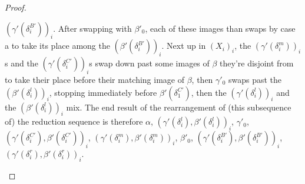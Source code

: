 \documentclass{article}
\theoremstyle{definition}
\theoremstyle{lemma}
\theoremstyle{remark}
\begin{document}
\begin{proof}
\begin{itemize}
$(\gamma'(\delta^{B'}_i))_i$. After swapping with $\beta'_0$, each of these images than swaps by case a to take its place among the $(\beta'(\delta^{B'}_i))_i$. Next up in $(X_i)_i$, the $(\gamma'(\delta^m_i))_i$s and the $(\gamma'(\delta^{C'}_i))_i$s swap down past some images of $\beta$ they're disjoint from to take their place before their matching image of $\beta$, then $\gamma'_0$ swaps past the $(\beta'(\delta^l_i))_i$, stopping immediately before $\beta'(\delta^{C'}_1)$, then the $(\gamma'(\delta^l_i))_i$ and the $(\beta'(\delta^l_i))_i$ mix. The end result of the rearrangement of (this subsequence of) the reduction sequence is therefore $\alpha$, $(\gamma'(\delta^l_i), \beta'(\delta^l_i))_i$, $\gamma'_0$, $(\gamma'(\delta^{C'}_i), \beta'(\delta^{C'}_i))_i$, $(\gamma'(\delta^m_i), \beta'(\delta^m_i))_i$, $\beta'_0$, $(\gamma'(\delta^{B'}_i), \beta'(\delta^{B'}_i))_i$, $(\gamma'(\delta^r_i), \beta'(\delta^r_i))_i$.


\end{itemize}
\end{proof}
\end{document}
